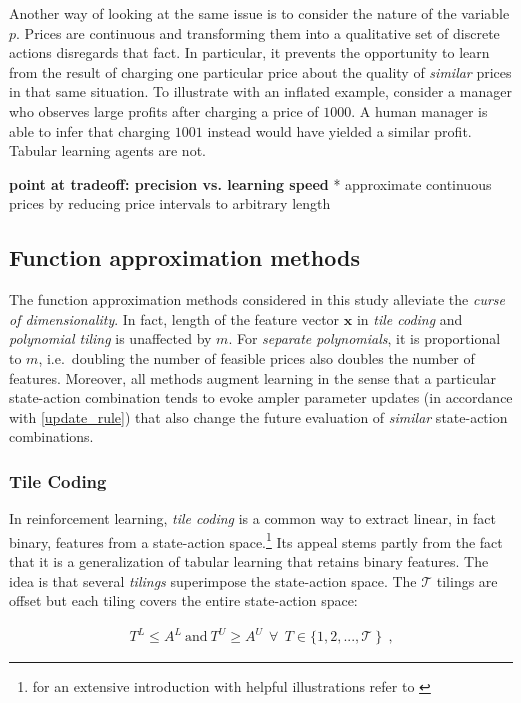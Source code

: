 Another way of looking at the same issue is to consider the nature of the variable $p$. Prices are continuous and transforming them into a qualitative set of discrete actions disregards that fact. In particular, it prevents the opportunity to learn from the result of charging one particular price about the quality of \emph{similar} prices in that same situation. To illustrate with an inflated example, consider a manager who observes large profits after charging a price of $1000$. A human manager is able to infer that charging $1001$ instead would have yielded a similar profit. Tabular learning agents are not.


\textbf{point at tradeoff: precision vs. learning speed}
			* approximate continuous prices by reducing price intervals to arbitrary length



\subsection{Function approximation methods}

The function approximation methods considered in this study alleviate the \emph{curse of dimensionality}. In fact, length of the feature vector $\boldsymbol{x}$ in \emph{tile coding} and \emph{polynomial tiling} is unaffected by $m$. For \emph{separate polynomials}, it is proportional to $m$, i.e.\ doubling the number of feasible prices also doubles the number of features. Moreover, all methods augment learning in the sense that a particular state-action combination tends to evoke ampler parameter updates (in accordance with \autoref{update_rule}) that also change the future evaluation of \emph{similar} state-action combinations.

\subsubsection{Tile Coding}\label{tile_coding}
In reinforcement learning, \emph{tile coding} is a common way to extract linear, in fact binary, features from a state-action space.\footnote{for an extensive introduction with helpful illustrations refer to \textcite{sutton_reinforcement_2018}} Its appeal stems partly from the fact that it is a generalization of tabular learning that retains binary features. The idea is that several \emph{tilings} superimpose the state-action space. The $\mathcal{T}$ tilings are offset but each tiling covers the entire state-action space:

\begin{gather}
	 T^L \leq A^L  ~ \text{and} ~ T^U \geq A^U ~~ \forall  ~~ T \in \{1, 2, ..., \mathcal{T} ~ \} ~~ \text{,}
\end{gather}

